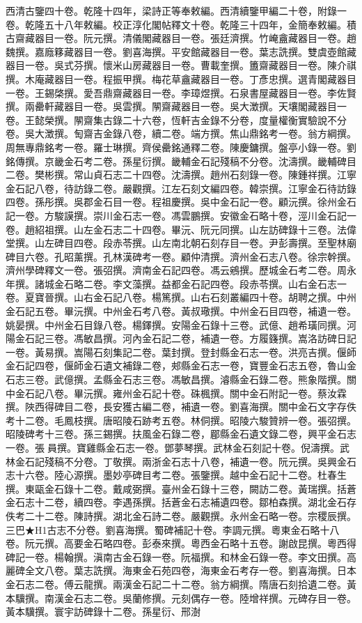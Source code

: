\begin{pinyinscope}
西清古鑒四十卷。乾隆十四年，梁詩正等奉敕編。西清續鑒甲編二十卷，附錄一卷。乾隆五十八年敕編。校正淳化閣帖釋文十卷。乾隆三十四年，金簡奉敕編。積古齋藏器目一卷。阮元撰。清儀閣藏器目一卷。張廷濟撰。竹崦盦藏器目一卷。趙魏撰。嘉廕簃藏器目一卷。劉喜海撰。平安館藏器目一卷。葉志詵撰。雙虞壺館藏器目一卷。吳式芬撰。懷米山房藏器目一卷。曹載奎撰。簠齋藏器目一卷。陳介祺撰。木庵藏器目一卷。程振甲撰。梅花草盦藏器目一卷。丁彥忠撰。選青閣藏器目一卷。王錫棨撰。愛吾鼎齋藏器目一卷。李璋煜撰。石泉書屋藏器目一卷。李佐賢撰。兩罍軒藏器目一卷。吳雲撰。䦛齋藏器目一卷。吳大澂撰。天壤閣藏器目一卷。王懿榮撰。䦛齋集古錄二十六卷，恆軒吉金錄不分卷，度量權衡實驗說不分卷。吳大澂撰。匋齋吉金錄八卷，續二卷。端方撰。焦山鼎銘考一卷。翁方綱撰。周無專鼎銘考一卷。羅士琳撰。齊侯罍銘通釋二卷。陳慶鏞撰。盤亭小錄一卷。劉銘傳撰。京畿金石考二卷。孫星衍撰。畿輔金石記殘稿不分卷。沈濤撰。畿輔碑目二卷。樊彬撰。常山貞石志二十四卷。沈濤撰。趙州石刻錄一卷。陳鍾祥撰。江寧金石記八卷，待訪錄二卷。嚴觀撰。江左石刻文編四卷。韓崇撰。江寧金石待訪錄四卷。孫彤撰。吳郡金石目一卷。程祖慶撰。吳中金石記一卷。顧沅撰。徐州金石記一卷。方駿謨撰。崇川金石志一卷。馮雲鵬撰。安徽金石略十卷，涇川金石記一卷。趙紹祖撰。山左金石志二十四卷。畢沅、阮元同撰。山左訪碑錄十三卷。法偉堂撰。山左碑目四卷。段赤苓撰。山左南北朝石刻存目一卷。尹彭壽撰。至聖林廟碑目六卷。孔昭薰撰。孔林漢碑考一卷。顧仲清撰。濟州金石志八卷。徐宗幹撰。濟州學碑釋文一卷。張弨撰。濟南金石記四卷。馮云鵷撰。歷城金石考二卷。周永年撰。諸城金石略二卷。李文藻撰。益都金石記四卷。段赤苓撰。山右金石志一卷。夏寶晉撰。山右金石記八卷。楊篤撰。山右石刻叢編四十卷。胡聘之撰。中州金石記五卷。畢沅撰。中州金石考八卷。黃叔璥撰。中州金石目四卷，補遺一卷。姚晏撰。中州金石目錄八卷。楊鐸撰。安陽金石錄十三卷。武億、趙希璜同撰。河陽金石記三卷。馮敏昌撰。河內金石記二卷，補遺一卷。方履籛撰。嵩洛訪碑日記一卷。黃易撰。嵩陽石刻集記二卷。葉封撰。登封縣金石志一卷。洪亮吉撰。偃師金石記四卷，偃師金石遺文補錄二卷，郟縣金石志一卷，寶豐金石志五卷，魯山金石志三卷。武億撰。孟縣金石志三卷。馮敏昌撰。濬縣金石錄二卷。熊象階撰。關中金石記八卷。畢沅撰。雍州金石記十卷。硃楓撰。關中金石附記一卷。蔡汝霖撰。陜西得碑目二卷，長安獲古編二卷，補遺一卷。劉喜海撰。關中金石文字存佚考十二卷。毛鳳枝撰。唐昭陵石跡考五卷。林侗撰。昭陵六駿贊辨一卷。張弨撰。昭陵碑考十三卷。孫三錫撰。扶風金石錄二卷，郿縣金石遺文錄二卷，興平金石志一卷。張員撰。寶雞縣金石志一卷。鄧夢琴撰。武林金石刻記十卷。倪濤撰。武林金石記殘稿不分卷。丁敬撰。兩浙金石志十八卷，補遺一卷。阮元撰。吳興金石志十六卷。陸心源撰。墨妙亭碑目考二卷。張鑒撰。越中金石記十二卷。杜春生撰。東甌金石錄十二卷。戴咸弼撰。臺州金石錄十三卷，闕訪二卷。黃瑞撰。括蒼金石志十二卷，續四卷。李遇孫撰。括蒼金石志補遺四卷。鄒柏森撰。湖北金石存佚考二十二卷。陳詩撰。湖北金石詩二卷。嚴觀撰。永州金石略一卷。宗稷辰撰。三巴★H1古志不分卷。劉喜海撰。蜀碑補記十卷。李調元撰。粵東金石略十八卷。阮元撰。高要金石略四卷。彭泰來撰。粵西金石略十五卷。謝啟昆撰。粵西得碑記一卷。楊翰撰。滇南古金石錄一卷。阮福撰。和林金石錄一卷。李文田撰。高麗碑全文八卷。葉志詵撰。海東金石苑四卷，海東金石考存一卷。劉喜海撰。日本金石志二卷。傅云龍撰。兩漢金石記二十二卷。翁方綱撰。隋唐石刻拾遺二卷。黃本驥撰。南漢金石志二卷。吳蘭修撰。元刻偶存一卷。陸增祥撰。元碑存目一卷。黃本驥撰。寰宇訪碑錄十二卷。孫星衍、邢澍
\end{pinyinscope}
